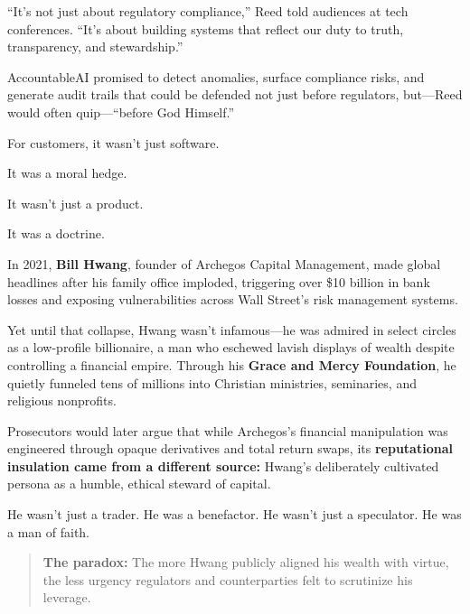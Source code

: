 “It’s not just about regulatory compliance,” Reed told audiences at tech conferences. “It’s about building systems that reflect our duty to truth, transparency, and stewardship.”

AccountableAI\texttrademark{} promised to detect anomalies, surface compliance risks, and generate audit trails that could be defended not just before regulators, but—Reed would often quip—“before God Himself.”

\medskip

For customers, it wasn’t just software.

It was a moral hedge.

It wasn’t just a product.

It was a doctrine.

\medskip

\begin{tcolorbox}[colback=blue!5!white, colframe=blue!50!black, breakable, title={Historical Sidebar: Bill Hwang, Archegos, and the Ethics Firewall}]
    In 2021, \textbf{Bill Hwang}, founder of Archegos Capital Management, made global headlines after his family office imploded, triggering over \$10 billion in bank losses and exposing vulnerabilities across Wall Street’s risk management systems.
    
    \medskip
    
    Yet until that collapse, Hwang wasn’t infamous—he was admired in select circles as a low-profile billionaire, a man who eschewed lavish displays of wealth despite controlling a financial empire. Through his \textbf{Grace and Mercy Foundation}, he quietly funneled tens of millions into Christian ministries, seminaries, and religious nonprofits.
    
    \medskip
    
    Prosecutors would later argue that while Archegos’s financial manipulation was engineered through opaque derivatives and total return swaps, its \textbf{reputational insulation came from a different source:} Hwang’s deliberately cultivated persona as a humble, ethical steward of capital.
    
    \medskip
    
    He wasn’t just a trader. He was a benefactor.  
    He wasn’t just a speculator. He was a man of faith.
    
    \medskip
    
    \begin{quote}
    \textbf{The paradox:} The more Hwang publicly aligned his wealth with virtue, the less urgency regulators and counterparties felt to scrutinize his leverage.
    \end{quote}
    

\end{tcolorbox}
